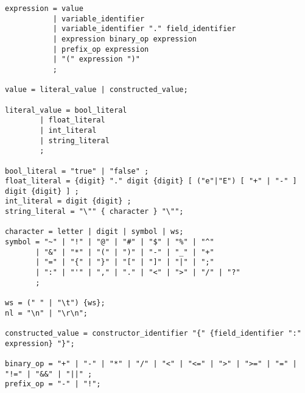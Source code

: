 \documentclass[conference]{IEEEtran}
\begin{document}
\begin{lstlisting}
expression = value
           | variable_identifier
           | variable_identifier "." field_identifier
           | expression binary_op expression
           | prefix_op expression
           | "(" expression ")"
           ;

value = literal_value | constructed_value;

literal_value = bool_literal
        | float_literal
        | int_literal
        | string_literal
        ;

bool_literal = "true" | "false" ;
float_literal = {digit} "." digit {digit} [ ("e"|"E") [ "+" | "-" ] digit {digit} ] ;
int_literal = digit {digit} ;
string_literal = "\"" { character } "\"";

character = letter | digit | symbol | ws;
symbol = "~" | "!" | "@" | "#" | "$" | "%" | "^" 
       | "&" | "*" | "(" | ")" | "-" | "_" | "+" 
       | "=" | "{" | "}" | "[" | "]" | "|" | ";" 
       | ":" | "'" | "," | "." | "<" | ">" | "/" | "?" 
       ;

ws = (" " | "\t") {ws};
nl = "\n" | "\r\n";

constructed_value = constructor_identifier "{" {field_identifier ":" expression} "}";

binary_op = "+" | "-" | "*" | "/" | "<" | "<=" | ">" | ">=" | "=" | "!=" | "&&" | "||" ;
prefix_op = "-" | "!";
\end{lstlisting}
\end{document}
